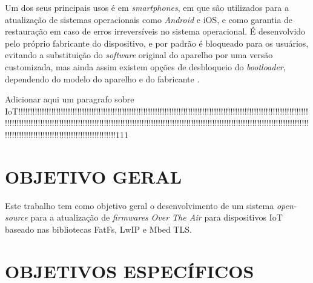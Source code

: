 Um dos seus principais usos é em \textit{smartphones}, em que são utilizados para a atualização de sistemas operacionais como \textit{Android} e iOS, e como garantia de restauração em caso de erros irreversíveis no sistema operacional. É desenvolvido pelo próprio fabricante do dispositivo, e por padrão é bloqueado para os usuários, evitando a substituição do \textit{software} original do aparelho por uma versão customizada, mas ainda assim existem opções de desbloqueio do \textit{bootloader}, dependendo do modelo do aparelho e do fabricante \cite{Salute2018}.%

Adicionar aqui um paragrafo sobre IoT!!!!!!!!!!!!!!!!!!!!!!!!!!!!!!!!!!!!!!!!!!!!!!!!!!!!!!!!!!!!!!!!!!!!!!!!!!!!!!!!!!!!!!!!!!!!!!!!!!!!!!!!!!!!!!!!!!!!!!!!!!!!!!!!!!!!!!!!!!!!!!!!!!!!!!!!!!!!!!!!!!!!!!!!!!!!!!!!!!!!!!!!!!!!!!!!!!!!!!!!!!!!!!!!!!!!!!!!!!!!!!!!!!!!!!!!!!!!!!!!!!!!!!!!!!!!!!!!!!!!!!!!!!!!!!!!!!!!!!!!!!!!!!!!!!!!!!!!!!!111





\section{OBJETIVO GERAL}
\label{sec:Objetivo Geral}

Este trabalho tem como objetivo geral o desenvolvimento de um sistema \textit{open-source} para a atualização  de \textit{firmwares} \textit{Over The Air} para dispositivos IoT baseado nas bibliotecas FatFs, LwIP e Mbed TLS. 

\section{OBJETIVOS ESPECÍFICOS}
\label{sec:Objetivos Específicos}

